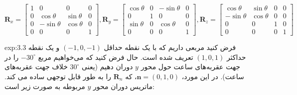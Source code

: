 {\begin{spacing}{1.5}
        \begin{center}
            $\textbf{R}_{x}=\begin{bmatrix}
                                1 & 0           & 0          & 0 \\
                                0 & \cos\theta  & \sin\theta & 0 \\
                                0 & -\sin\theta & \cos\theta & 0 \\
                                0 & 0           & 0          & 1
            \end{bmatrix}, \textbf{R}_{y}=\begin{bmatrix}
                                              \cos\theta & 0 & -\sin\theta & 0 \\
                                              0          & 1 & 0           & 0 \\
                                              \sin\theta & 0 & \cos\theta  & 0 \\
                                              0          & 0 & 0           & 1
            \end{bmatrix}, \textbf{R}_{z}=\begin{bmatrix}
                                              \cos\theta  & \sin\theta & 0 & 0 \\
                                              -\sin\theta & \cos\theta & 0 & 0 \\
                                              0           & 0          & 1 & 0 \\
                                              0           & 0          & 0 & 1
            \end{bmatrix}$
        \end{center}

        \begin{example}{exp:3.3}
            \Large
            فرض کنید مربعی داریم که با یک نقطه حداقل $(-1, 0, -1)$ و یک نقطه حداکثر $(1, 0, 1)$ تعریف شده است.
            حال فرض کنید که می‌خواهیم مربع $-30^\circ$ را در جهت عقربه‌های ساعت حول محور $y$ دوران دهیم (یعنی $30^\circ$ خلاف جهت عقربه‌های ساعت).
            در این مورد، $\textbf{n}=(0,1,0)$، که $\textbf{R}_{n}$ را به طور قابل توجهی ساده می کند.
            ماتریس دوران محور $y$  مربوطه به صورت زیر است:


\end{example}
\end{spacing}}
